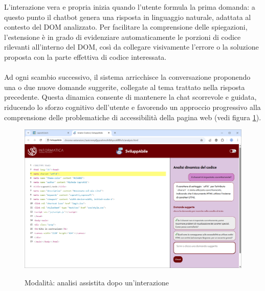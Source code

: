\noindent L’interazione vera e propria inizia quando l’utente formula la prima domanda: a questo punto il chatbot genera una risposta in linguaggio naturale, adattata al contesto del DOM analizzato. Per facilitare la comprensione delle spiegazioni, l’estensione è in grado di evidenziare automaticamente le porzioni di codice rilevanti all’interno del DOM, così da collegare visivamente l’errore o la soluzione proposta con la parte effettiva di codice interessata.\\
\\
Ad ogni scambio successivo, il sistema arricchisce la conversazione proponendo una o due nuove domande suggerite, collegate al tema trattato nella risposta precedente. Questa dinamica consente di mantenere la chat scorrevole e guidata, riducendo lo sforzo cognitivo dell’utente e favorendo un approccio progressivo alla comprensione delle problematiche di accessibilità della pagina web (vedi figura \ref{fig:aass2}).

\begin{figure}[H]
    \centering
    \includegraphics[width=1\linewidth, alt={Modalità di analisi assistita, dopo la prima interazione}]{img/analisi_ass2.png}
    \caption{Modalità: analisi assistita dopo un'interazione}\label{fig:aass2}
\end{figure}

